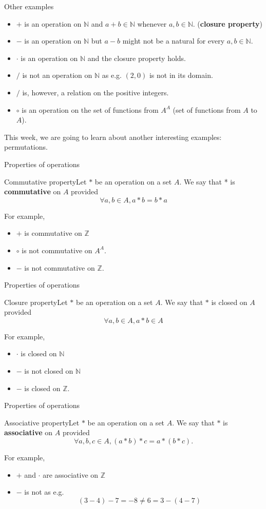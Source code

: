 \documentclass{beamer}
\def\bl[#1]#2{\begin{block}{#1}#2\end{block}}
\def\itemb{\begin{itemize}}
\def\iteme{\end{itemize}}
\begin{document}
\begin{frame}{Other examples}
\itemb
\item $+$ is an operation on $\mathbb{N}$ and $a+b\in \mathbb{N}$ whenever $a,b\in \mathbb{N}$. (\textbf{closure property})
\item $-$ is an operation on $\mathbb{N}$ but $a-b$ might not be a natural for every $a,b\in\mathbb{N}$.
\item $\cdot$ is an operation on $\mathbb{N}$ and the closure property holds.
\item $/$ is not an operation on $\mathbb{N}$ as e.g. $(2,0)$ is not in its domain.
\item $/$ is, however, a relation on the positive integers.
\item $\circ$ is an operation on the set of functions from $A^A$ (set of functions from $A$ to $A$).
\iteme

This week, we are going to learn about another interesting examples: permutations.
\end{frame}

\begin{frame}{Properties of operations}
\bl[Commutative property]{Let $*$ be an operation on a set $A$. We say that * is \textbf{commutative} on $A$ provided
\[
\forall a,b\in A, a*b=b*a
\]}
For example, 
\itemb
\item $+$ is commutative on $\mathbb{Z}$
\item $\circ$ is not commutative on $A^A$. 
\item $-$ is not commutative on $\mathbb{Z}$.
\iteme
\end{frame}

\begin{frame}{Properties of operations}
\bl[Closure property]{Let $*$ be an operation on a set $A$. We say that $*$ is closed on $A$ provided
\[
\forall a,b\in A, a*b\in A
\]}
For example,
\itemb
\item $\cdot$ is closed on $\mathbb{N}$
\item $-$ is not closed on $\mathbb{N}$
\item $-$ is closed on $\mathbb{Z}$.
\iteme
\end{frame}

\begin{frame}{Properties of operations}
\bl[Associative property]{Let $*$ be an operation on a set $A$. We say that $*$ is \textbf{associative} on $A$ provided
\[
\forall a,b,c\in A, (a*b)*c=a*(b*c).
\]}
For example, 
\itemb
\item $+$ and $\cdot$ are associative on $\mathbb{Z}$
\item  $-$ is not as e.g.
\[
(3-4)-7=-8\neq 6= 3-(4-7)
\]
\iteme
\end{frame}
\end{document}
